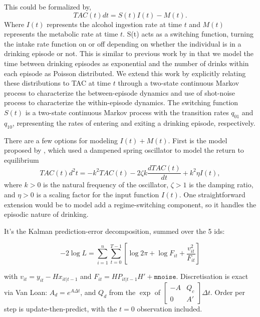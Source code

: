 This could be formalized by,
 \begin{equation}
 TAC(t) dt = S(t) I(t) - M(t).
 \end{equation}
Where $I(t)$ represents the alcohol ingestion rate at time $t$ and $M(t)$ represents the 
metabolic rate at time $t$. S(t) acts as a switching function, turning the intake rate 
function on or off depending on whether the individual is in a drinking episode or not.
This is similar to previous work by \parencite{duffy1992} in that we model the time between
drinking episodes as exponential and the number of drinks within each episode as Poisson
distributed. We extend this work by explicitly relating these distributions to TAC at time $t$
through a two-state continuous Markov process to characterize the between-episode dynamics 
and use of shot-noise process to characterize the within-episode dynamics.
The switching function $S(t)$ is a two-state continuous Markov process with the 
transition rates $q_{01}$ and $q_{10}$, representing the rates of entering and 
exiting a drinking episode, respectively. 

There are a few options for modeling $I(t) + M(t)$.
First is the model proposed by \parencite{giraldo2017a}, which used a dampened spring 
oscillator to model the return to equilibrium
\begin{equation}
    TAC(t) d^2t = -k^2TAC(t) - 2 \zeta k \frac{dTAC(t)}{dt} + k^2 \eta I(t),
\end{equation}
where $k > 0$ is the natural frequency of the oscillator, $\zeta > 1$ is the damping ratio, 
and $\eta > 0$ is a scaling factor for the input function $I(t)$. One straightforward
extension would be to model add a regime-switching component, so it handles the episodic
nature of drinking.

It's the Kalman prediction-error decomposition, summed over the 5 ids:

$$-2\log L=\sum_{i=1}^{n}\sum_{t=0}^{T-1}\left[\log 2\pi+\log F_{it}+\frac{v_{it}^2}{F_{it}}\right]$$

with $v_{it}=y_{it}-Hx_{it|t-1}$ and $F_{it}=HP_{it|t-1}H'+\texttt{mnoise}$. Discretisation is exact via Van Loan: $A_d=e^{A\Delta t}$, and $Q_d$ from the $\exp$ of $\begin{bmatrix}-A&Q_c\\0&A'\end{bmatrix}\Delta t$. Order per step is update-then-predict, with the $t=0$ observation included.
